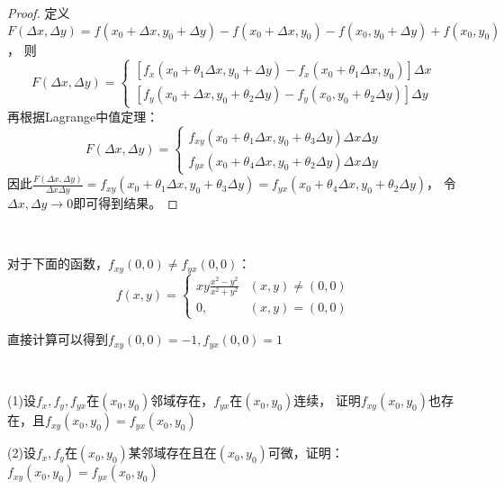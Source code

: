 \begin{proof}
  定义$F(\Delta x, \Delta y) = f(x_0 + \Delta x, y_0 + \Delta y) - f(x_0 + \Delta x, y_0) - f(x_0,y_0 + \Delta y) + f(x_0,y_0)$，
  则
  \begin{equation*}
    F(\Delta x, \Delta y) =
    \begin{cases}
      [f_x(x_0 + \theta_1 \Delta x, y_0 + \Delta y) - f_x(x_0 + \theta_1 \Delta x, y_0)]\Delta x\\
      [f_y(x_0 + \Delta x, y_0 + \theta_2 \Delta y) - f_y(x_0,y_0 + \theta_2\Delta y)]\Delta y
    \end{cases}
  \end{equation*}
  再根据Lagrange中值定理：
  \begin{equation*}
    F(\Delta x, \Delta y) =
    \begin{cases}
      f_{xy}(x_0 + \theta_1 \Delta x, y_0 + \theta_3 \Delta y)\Delta x \Delta y\\
      f_{yx}(x_0 + \theta_4\Delta x, y_0 + \theta_2 \Delta y)\Delta x \Delta y
    \end{cases}
  \end{equation*}
  因此$\frac{F(\Delta x, \Delta y)}{\Delta x \Delta y} = f_{xy}(x_0 + \theta_1 \Delta x, y_0 + \theta_3 \Delta y) = f_{yx}(x_0 + \theta_4 \Delta x, y_0 + \theta_2 \Delta y)$，
  令$\Delta x, \Delta y \rightarrow 0$即可得到结果。
\end{proof}

~

\begin{exercise}[混合偏导不相同的例子]
  对于下面的函数，$f_{xy}(0,0) \neq f_{yx}(0,0)$：
  \begin{equation*}
    f(x,y) =
    \begin{cases}
      xy \frac{x^2 - y^2}{x^2 + y^{2}}& (x,y) \neq (0,0)\\
      0, & (x,y) = (0,0)
    \end{cases}
  \end{equation*}
\end{exercise}

\begin{solution}
  直接计算可以得到$f_{xy}(0,0) = -1, f_{yx}(0,0) = 1$
\end{solution}

~

\begin{exercise}[混合偏导相关练习]
  (1)设$f_x,f_y,f_{yx}$在$(x_0,y_0)$邻域存在，$f_{yx}$在$(x_0,y_0)$连续，
  证明$f_{xy}(x_0,y_0)$也存在，且$f_{xy}(x_0,y_0) = f_{yx}(x_0,y_0)$

  (2)设$f_x, f_y$在$(x_0,y_0)$某邻域存在且在$(x_0,y_0)$可微，证明：
  $f_{xy}(x_0,y_0) = f_{yx}(x_0,y_0)$
\end{exercise}





